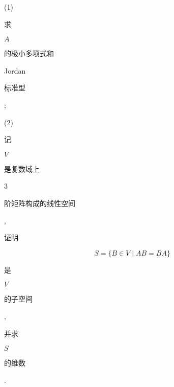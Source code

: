 \documentclass[10pt]{article}
\begin{document}
\begin{enumerate}
\end{enumerate}
(1) \begin{CJK}{UTF8}{mj}求\end{CJK} $A$ \begin{CJK}{UTF8}{mj}的极小多项式和\end{CJK} Jordan \begin{CJK}{UTF8}{mj}标准型\end{CJK};

(2) \begin{CJK}{UTF8}{mj}记\end{CJK} $V$ \begin{CJK}{UTF8}{mj}是复数域上\end{CJK} 3 \begin{CJK}{UTF8}{mj}阶矩阵构成的线性空间\end{CJK}, \begin{CJK}{UTF8}{mj}证明\end{CJK}
$$
S=\{B \in V \mid A B=B A\}
$$
\begin{CJK}{UTF8}{mj}是\end{CJK} $V$ \begin{CJK}{UTF8}{mj}的子空间\end{CJK}, \begin{CJK}{UTF8}{mj}并求\end{CJK} $S$ \begin{CJK}{UTF8}{mj}的维数\end{CJK}.
\end{document}
